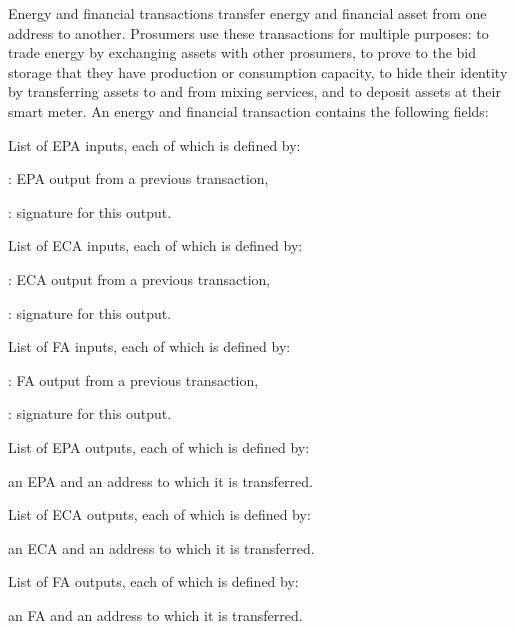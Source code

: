 Energy and financial transactions transfer energy and financial asset from one address to another.
Prosumers use these transactions for multiple purposes: to trade energy by exchanging assets with other prosumers, to prove to the bid storage that they have production or consumption capacity, to hide their identity by transferring assets to and from mixing services, and to deposit assets at their smart meter.
%
An energy and financial transaction contains the following fields:
\begin{compactitem}
\item List of EPA inputs, each of which is defined by:
\begin{compactitem}
\item {}: EPA output from a previous transaction,
\item {}: signature for this output.
\end{compactitem}
\item List of ECA inputs, each of which is defined by:
\begin{compactitem}
\item {}: ECA output from a previous transaction,
\item {}: signature for this output.
\end{compactitem}
\item List of FA inputs, each of which is defined by:
\begin{compactitem}
\item {}: FA output from a previous transaction,
\item {}: signature for this output.
\end{compactitem}
\item List of EPA outputs, each of which is defined by:
\begin{compactitem}
\item an EPA and an address to which it is transferred.
\end{compactitem}
\item List of ECA outputs, each of which is defined by:
\begin{compactitem}
\item an ECA and an address to which it is transferred.
\end{compactitem}
\item List of FA outputs, each of which is defined by:
\begin{compactitem}
\item an FA and an address to which it is transferred.
\end{compactitem}
\end{compactitem}

